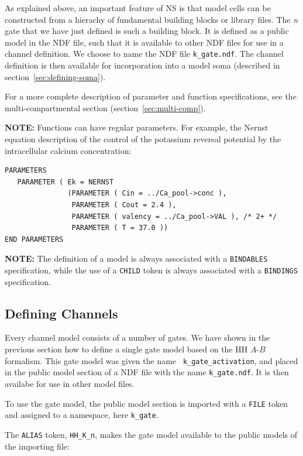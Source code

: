 \documentclass[12pt]{article}
\begin{document}
As explained above, an important feature of NS is that model cells
can be constructed from a hierachy of fundamental building blocks or
library files.  The {\it n} gate that we have just defined is such a
building block.  It is defined as
a public model in the NDF file, such that it is available to other NDF
files for use in a channel definition.  We choose to name the NDF file
{\tt k\_gate.ndf}.  The channel definition is then available for
incorporation into a model soma (described in
section~\ref{sec:defining-soma}).

For a more complete description of parameter and function
specifications, see the multi-compartmental section
(section~\ref{sec:multi-comp}).

{\bf NOTE:} Functions can have regular parameters.
For example, the Nernst equation description of the control of the
potassium reversal potential by the intracellular calcium concentration:

\begin{verbatim}
PARAMETERS
   PARAMETER ( Ek = NERNST
               (PARAMETER ( Cin = ../Ca_pool->conc ),
                PARAMETER ( Cout = 2.4 ),
                PARAMETER ( valency = ../Ca_pool->VAL ), /* 2+ */
                PARAMETER ( T = 37.0 ))
END PARAMETERS
\end{verbatim}

{\bf NOTE:} The definition of a model is always associated with a {\tt BINDABLES}
specification, while the use of a {\tt CHILD} token is always
associated with a {\tt BINDINGS} specification.

\subsection{Defining Channels}
\label{sec:defining-channels}

Every channel model consists of a number of gates.  We have shown in
the previous section how to define a single gate model based on the
HH $A$-$B$ formalism.  This gate model was given the name {\tt
  k\_gate\_activation}, and placed in the public model section of a
NDF file with the name {\tt k\_gate.ndf}.  It is then availabe for use
in other model files.

To use the gate model, the public model section is imported with a
{\tt FILE} token and assigned to a namespace, here {\tt k\_gate}.

The {\tt ALIAS} token, {\tt HH\_K\_n}, makes the gate model available
to the public models of the importing file:
\end{document}
